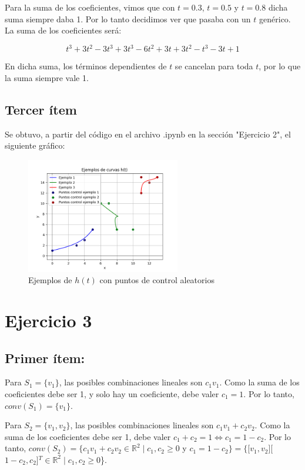 \documentclass{article}
\begin{document}
Para la suma de los coeficientes, vimos que con $t=0.3$, $t=0.5$ y $t=0.8$ dicha suma siempre daba 1. Por lo tanto decidimos ver que pasaba con un $t$ genérico. La suma de los coeficientes será:

$$
t^3 + 3t^2-3t^3 + 3t^3-6t^2+3t +3t^2-t^3-3t+1
$$

En dicha suma, los términos dependientes de $t$ se cancelan para toda $t$, por lo que la suma siempre vale 1.

\subsection*{Tercer ítem}
Se obtuvo, a partir del código en el archivo .ipynb en la sección "Ejercicio 2", el siguiente gráfico:

\begin{figure}[H]
    \centering
    \includegraphics[width=0.6\textwidth]{imagenes/graf_2c.png}
    \caption{Ejemplos de $h(t)$ con puntos de control aleatorios}
    \label{fig:ejemplo}
\end{figure}

\section*{Ejercicio 3}

\subsection*{Primer ítem:}
Para $S_1 = \{v_1\}$, las posibles combinaciones lineales son $c_1 v_1$. Como la suma de los coeficientes debe ser 1, y solo hay un coeficiente, debe valer $c_1 = 1$. Por lo tanto, $conv(S_1) = \{v_1\}$.
 
Para $S_2 = \{v_1, v_2\}$, las posibles combinaciones lineales son $c_1 v_1 + c_2 v_2$. Como la suma de los coeficientes debe ser 1, debe valer $c_1 + c_2= 1 \iff c_1 = 1 - c_2$. Por lo tanto, $conv(S_2) = \{c_1 v_1+ c_2 v_2 \in \mathbb{R}^2 \mid c_1, c_2 \geq 0$ y $ c_1 = 1- c_2\} = \{$[$v_1, v_2$][$1-c_2, c_2$]$^T \in \mathbb{R}^2 \mid c_1, c_2 \geq 0$\}.
\end{document}
